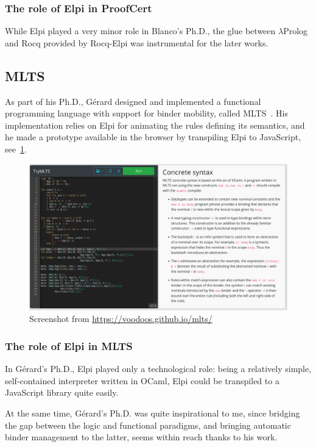 \documentclass[a4paper, 11pt]{book}
\begin{document}
\subsubsection{The role of Elpi in ProofCert}

While Elpi played a very minor role in Blanco's Ph.D., the glue between
$\lambda$Prolog and Rocq provided by Rocq-Elpi was instrumental for the later
works.

\subsection{MLTS}

As part of his Ph.D., G\'{e}rard designed and implemented a
functional programming language with support for binder mobility, called MLTS~\cite{mlts}.
His implementation relies on Elpi for animating the rules defining its
semantics, and he made a prototype available in the browser by transpiling
Elpi to JavaScript, see~\cref{fig:mlts}.

\begin{figure}
    \includegraphics[width=.9\textwidth]{MLTS}
    \caption{Screenshot from \url{https://voodoos.github.io/mlts/}\label{fig:mlts}}
\end{figure}

\subsubsection{The role of Elpi in MLTS}

In G\'{e}rard's Ph.D., Elpi played only a technological role: being a
relatively simple, self-contained interpreter written in OCaml, Elpi could be
transpiled to a JavaScript library quite easily.

At the same time, G\'{e}rard's Ph.D. was quite inspirational to me, since
bridging the gap between the logic and functional paradigms, and bringing
automatic binder management to the latter, seems within reach thanks to his
work.
\end{document}

